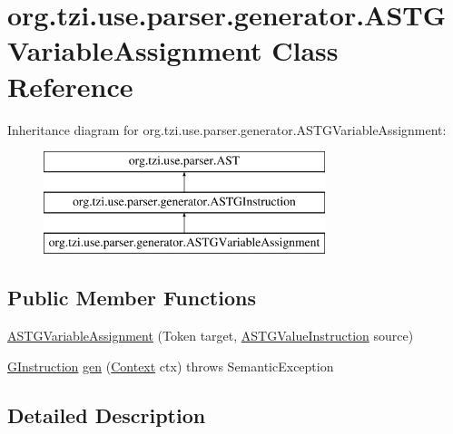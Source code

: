 \hypertarget{classorg_1_1tzi_1_1use_1_1parser_1_1generator_1_1_a_s_t_g_variable_assignment}{\section{org.\-tzi.\-use.\-parser.\-generator.\-A\-S\-T\-G\-Variable\-Assignment Class Reference}
\label{classorg_1_1tzi_1_1use_1_1parser_1_1generator_1_1_a_s_t_g_variable_assignment}
}
Inheritance diagram for org.\-tzi.\-use.\-parser.\-generator.\-A\-S\-T\-G\-Variable\-Assignment\-:\begin{figure}[H]
\begin{center}
\leavevmode
\includegraphics[height=3.000000cm]{classorg_1_1tzi_1_1use_1_1parser_1_1generator_1_1_a_s_t_g_variable_assignment}
\end{center}
\end{figure}
\subsection*{Public Member Functions}
\begin{DoxyCompactItemize}
\item 
\hyperlink{classorg_1_1tzi_1_1use_1_1parser_1_1generator_1_1_a_s_t_g_variable_assignment_a69e2663e1aa0fc8534122d58d4c36ac7}{A\-S\-T\-G\-Variable\-Assignment} (Token target, \hyperlink{classorg_1_1tzi_1_1use_1_1parser_1_1generator_1_1_a_s_t_g_value_instruction}{A\-S\-T\-G\-Value\-Instruction} source)
\item 
\hyperlink{interfaceorg_1_1tzi_1_1use_1_1gen_1_1assl_1_1statics_1_1_g_instruction}{G\-Instruction} \hyperlink{classorg_1_1tzi_1_1use_1_1parser_1_1generator_1_1_a_s_t_g_variable_assignment_a744d995b94317890faea7bb783a9bd41}{gen} (\hyperlink{classorg_1_1tzi_1_1use_1_1parser_1_1_context}{Context} ctx)  throws Semantic\-Exception 
\end{DoxyCompactItemize}


\subsection{Detailed Description}


